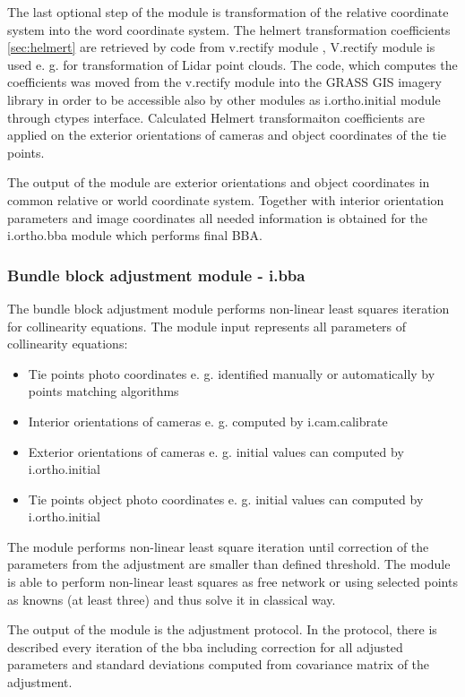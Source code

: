 \documentclass[a4paper,12pt]{article}
\begin{document}
The last optional step of the module is transformation of the relative coordinate system into the word coordinate system. The helmert 
transformation coefficients \ref{sec:helmert} are retrieved by code from v.rectify module \cite{v.rectify}, V.rectify module is used e. g. for transformation of Lidar point clouds.
The code, which computes the coefficients
was moved from the v.rectify module into the GRASS GIS imagery library in order to be accessible also by other modules as i.ortho.initial
module through ctypes interface.
Calculated Helmert transformaiton coefficients are applied on the exterior orientations of cameras and object coordinates of the tie points.

The output of the module are exterior orientations and object coordinates in common relative or world coordinate system. Together with interior
orientation parameters and image coordinates all needed information is obtained  for the i.ortho.bba module which performs final BBA.  

\subsubsection{Bundle block adjustment module - i.bba}

The bundle block adjustment module performs non-linear least squares iteration for collinearity equations. 
The module input represents all parameters of collinearity equations:
\begin{itemize}
\item Tie points photo coordinates e. g. identified manually or automatically by points matching algorithms
\item Interior orientations of cameras e. g. computed by i.cam.calibrate
\item Exterior orientations of cameras e. g. initial values can computed by i.ortho.initial
\item Tie points object photo coordinates e. g. initial values can computed by i.ortho.initial
\end{itemize}

The module performs non-linear least square iteration until correction of the parameters from the adjustment are smaller than
defined threshold. The module is able to perform non-linear least squares as free network or using selected points 
as knowns (at least three) and thus solve it in classical way. 

The output of the module is the adjustment protocol. In the protocol, there
is described every iteration of the bba including correction for all adjusted parameters and standard deviations computed from 
covariance matrix of the adjustment. 
\end{document}
